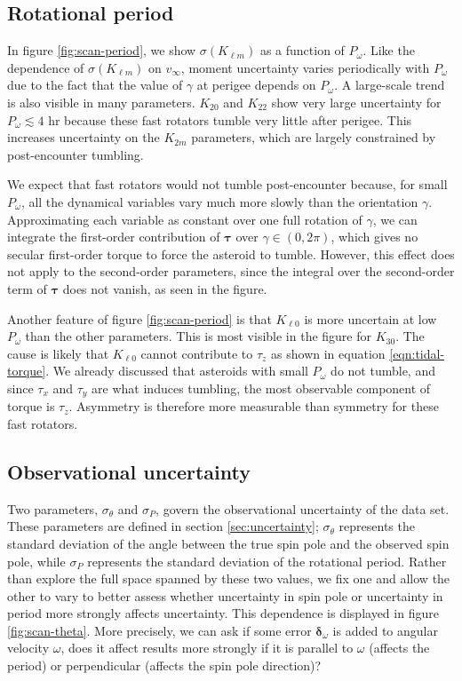 \subsection{Rotational period}
\label{sec:scan-period}

In figure \ref{fig:scan-period}, we show $\sigma(K_{\ell m})$ as a function of $P_\omega$. Like the dependence of $\sigma(K_{\ell m})$ on $v_\infty$, moment uncertainty varies periodically with $P_\omega$ due to the fact that the value of $\gamma$ at perigee depends on $P_\omega$. A large-scale trend is also visible in many parameters. $K_{20}$ and $K_{22}$ show very large uncertainty for $P_\omega \lesssim 4$ hr because these fast rotators tumble very little after perigee. This increases uncertainty on the $K_{2m}$ parameters, which are largely constrained by post-encounter tumbling.

We expect that fast rotators would not tumble post-encounter because, for small $P_\omega$, all the dynamical variables vary much more slowly than the orientation $\gamma$. Approximating each variable as constant over one full rotation of $\gamma$, we can integrate the first-order contribution of $\bm \tau$ over $\gamma \in (0, 2\pi)$, which gives no secular first-order torque to force the asteroid to tumble. However, this effect does not apply to the second-order parameters, since the integral over the second-order term of $\bm \tau$ does not vanish, as seen in the figure.

Another feature of figure \ref{fig:scan-period} is that $K_{\ell 0}$ is more uncertain at low $P_\omega$ than the other parameters. This is most visible in the figure for $K_{30}$. The cause is likely that $K_{\ell 0}$ cannot contribute to $\tau_z$ as shown in equation \ref{eqn:tidal-torque}. We already discussed that asteroids with small $P_\omega$ do not tumble, and since $\tau_x$ and $\tau_y$ are what induces tumbling, the most observable component of torque is $\tau_z$. Asymmetry is therefore more measurable than symmetry for these fast rotators.


\subsection{Observational uncertainty}
\label{sec:scan-uncertainty}
Two parameters, $\sigma_\theta$ and $\sigma_P$, govern the observational uncertainty of the data set. These parameters are defined in section \ref{sec:uncertainty}; $\sigma_\theta$ represents the standard deviation of the angle between the true spin pole and the observed spin pole, while $\sigma_P$ represents the standard deviation of the rotational period. Rather than explore the full space spanned by these two values, we fix one and allow the other to vary to better assess whether uncertainty in spin pole or uncertainty in period more strongly affects uncertainty. This dependence is displayed in figure \ref{fig:scan-theta}. More precisely, we can ask if some error $\bm {\delta}_\omega$ is added to angular velocity $\omega$, does it affect results more strongly if it is parallel to $\omega$ (affects the period) or perpendicular (affects the spin pole direction)?

